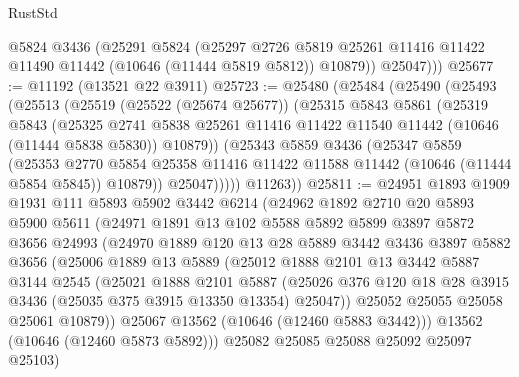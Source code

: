\begin{lexlean}{RustStd}
\begin{coremodule}
          @5824
          @3436
          (@25291
            @5824
            (@25297
              @2726
              @5819
              @25261
              @11416
              @11422
              @11490
              @11442
              (@10646 (@11444 @5819 @5812))
              @10879))
          @25047)))
@25677 := @11192 (@13521 @22 @3911)
@25723 := @25480
    (@25484
      (@25490
        (@25493
          (@25513
            (@25519
              (@25522 (@25674 @25677))
              (@25315
                @5843
                @5861
                (@25319
                  @5843
                  (@25325
                    @2741
                    @5838
                    @25261
                    @11416
                    @11422
                    @11540
                    @11442
                    (@10646 (@11444 @5838 @5830))
                    @10879))
                (@25343
                  @5859
                  @3436
                  (@25347
                    @5859
                    (@25353
                      @2770
                      @5854
                      @25358
                      @11416
                      @11422
                      @11588
                      @11442
                      (@10646 (@11444 @5854 @5845))
                      @10879))
                  @25047)))))
        @11263))
@25811 := @24951
    @1893
    @1909
    @1931
    @111
    @5893
    @5902
    @3442
    @6214
    (@24962
      @1892
      @2710
      @20
      @5893
      @5900
      @5611
      (@24971
        @1891
        @13
        @102
        @5588
        @5892
        @5899
        @3897
        @5872
        @3656
        @24993
        (@24970
          @1889
          @120
          @13
          @28
          @5889
          @3442
          @3436
          @3897
          @5882
          @3656
          (@25006
            @1889
            @13
            @5889
            (@25012
              @1888
              @2101
              @13
              @3442
              @5887
              @3144
              @2545
              (@25021
                @1888
                @2101
                @5887
                (@25026 @376 @120 @18 @28 @3915 @3436 (@25035 @375 @3915 @13350 @13354) @25047))
              @25052
              @25055
              @25058
              @25061
              @10879))
          @25067
          @13562
          (@10646 (@12460 @5883 @3442)))
        @13562
        (@10646 (@12460 @5873 @5892)))
      @25082
      @25085
      @25088
      @25092
      @25097
      @25103)

\end{coremodule}
\end{lexlean}

